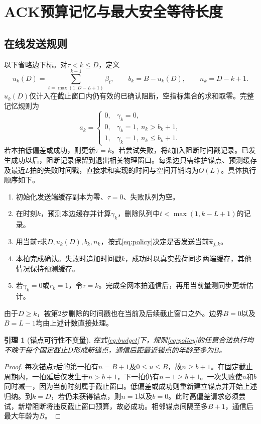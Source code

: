 \documentclass[UTF8,a4paper,zihao=5,fontset=windows]{ctexart}
\newtheorem{lemma}{引理}
\begin{document}
\section{ACK预算记忆与最大安全等待长度}
\subsection{在线发送规则}\label{sec:online}
以下省略边下标。对$\tau<k\le D$，定义
\begin{equation}
u_k(D)=\sum_{t=\max(1,D-L+1)}^{k-1}\beta_t,\qquad
b_k=B-u_k(D),\qquad n_k=D-k+1.
\label{eq:occupancy}
\end{equation}
$u_k(D)$仅计入在截止窗口内仍有效的已确认阻断，空指标集合的求和取零。完整记忆规则为
\begin{equation}
a_k=
\begin{cases}
0,&\gamma_k=0,\\
0,&\gamma_k=1,\ n_k>b_k+1,\\
1,&\gamma_k=1,\ n_k\le b_k+1.
\end{cases}
\label{eq:policy}
\end{equation}
若本拍低偏差或成功，则更新$\tau=k$。若尝试失败，将$k$加入阻断时间戳记录。已发生成功以后，阻断记录保留到退出相关物理窗口。每条边只需维护锚点、预测缓存及最近$L$拍的失败时间戳，直接求和实现的时间与空间开销均为$O(L)$。具体执行顺序如下。
\begin{enumerate}
\setlength{\itemsep}{0pt}
\item 初始化发送端缓存副本为零、$\tau=0$、失败队列为空。
\item 在时刻$k$，预测本边缓存并计算$\gamma_k$，删除队列中$t<\max(1,k-L+1)$的记录。
\item 用当前$\tau$求$D,u_k(D),b_k,n_k$，按式\eqref{eq:policy}决定是否发送当前$\hat {\bm{x}}_{j,k}$。
\item 本拍完成确认。失败时追加时间戳$k$，成功时以真实载荷同步两端缓存，其他情况保持预测缓存。
\item 若$\gamma_k=0$或$r_k=1$，令$\tau=k$。完成全网本拍通信后，再用当前量测同步更新估计。
\end{enumerate}
由于$D\ge k$，被第2步删除的时间戳也在当前及后续截止窗口之外。边界$B=0$以及$B=L-1$均由上述计数直接处理。

\begin{lemma}[锚点可行性不变量]\label{lem:invariant}
在式\eqref{eq:budget}下，规则\eqref{eq:policy}的任意合法执行均不晚于每个固定截止$D$形成新锚点，通信后距最近锚点的年龄至多为$B$。
\end{lemma}
\begin{proof}
每次锚点$\tau$后的第一拍有$n=B+1$及$0\le u\le B$，故$n\ge b+1$。在固定截止周期内，一拍延后仅发生于$n>b+1$，下一拍仍有$n-1\ge b+1$。一次失败使$n$和$b$同时减一，因为当前时刻属于截止窗口。低偏差或成功则重新建立锚点并开始上述归纳。到$k=D$，若仍未获得锚点，则$n=1$以及$b=0$。此时高偏差请求必须尝试，新增阻断将违反截止窗口预算，故必成功。相邻锚点间隔至多$B+1$，通信后最大年龄为$B$。
\end{proof}
\end{document}
